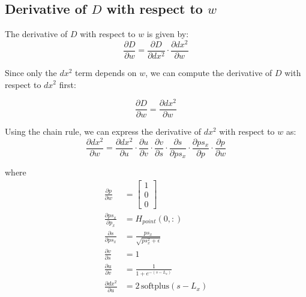 \documentclass[11pt]{article}
\begin{document}
        \subsection*{Derivative of $D$ with respect to $w$}
            The derivative of \(D\) with respect to \(w\) is given by:
            \begin{equation}
                \frac{\partial D}{\partial w} = \frac{\partial D}{\partial dx^2} \cdot \frac{\partial dx^2}{\partial w}
            \end{equation}

            Since only the \(dx^2\) term depends on \(w\), we can compute the derivative of \(D\) with respect to \(dx^2\) first:

            \begin{equation}
                \frac{\partial D}{\partial w} = \frac{\partial dx^2}{\partial w}
            \end{equation}

            Using the chain rule, we can express the derivative of \(dx^2\) with respect to \(w\) as:
            \begin{equation}
                \frac{\partial dx^2}{\partial w} = \frac{\partial dx^2}{\partial u} \cdot \frac{\partial u}{\partial v} \cdot \frac{\partial v}{\partial s} \cdot \frac{\partial s}{\partial ps_{x}} \cdot \frac{\partial ps_{x}}{\partial p} \cdot \frac{\partial p}{\partial w}
            \end{equation}

            where
            \begin{align}
                \frac{\partial p}{\partial w} &= \begin{bmatrix} 1 \\ 0 \\ 0 \end{bmatrix} \\
                \frac{\partial ps_{x}}{\partial p_x} &= H_{point}(0,:) \\
                \frac{\partial s}{\partial ps_{x}} &= \frac{ps_{x}}{\sqrt{ps_{x}^2 + \epsilon}}\\
                \frac{\partial v}{\partial s} &= 1\\
                \frac{\partial u}{\partial v} &= \frac{1}{1 + e^{-(s - L_x)}}\\
                \frac{\partial dx^2}{\partial u} &= 2\,\text{softplus}(s - L_x)\\
            \end{align}
\end{document}
